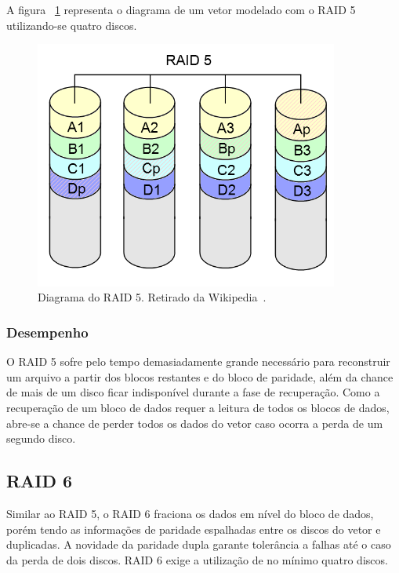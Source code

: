 		A figura ~\ref{fig:raid5} representa o diagrama de um vetor modelado com o RAID 5 utilizando-se quatro discos.\\
		
		\begin{figure}[htb]
			\begin{center}
				
				\includegraphics[clip,width=10.0cm]{images/RAID_5.png}
				\caption{Diagrama do RAID 5. Retirado da Wikipedia~\citep{wikiRAIDlevels}.}
				\label{fig:raid5}
			\end{center}
		\end{figure} 
		
		\subsubsection{Desempenho}
		O RAID 5 sofre pelo tempo demasiadamente grande necessário para reconstruir um arquivo a partir dos blocos restantes e do bloco de paridade, além da chance de mais de um disco ficar indisponível durante a fase de recuperação. Como a recuperação de um bloco de dados requer a leitura de todos os blocos de dados, abre-se a chance de perder todos os dados do vetor caso ocorra a perda de um segundo disco.\\
		
		\subsection{RAID 6}
		Similar ao RAID 5, o RAID 6 fraciona os dados em nível do bloco de dados, porém tendo as informações de paridade espalhadas entre os discos do vetor e duplicadas. A novidade da paridade dupla garante tolerância a falhas até o caso da perda de dois discos. RAID 6 exige a utilização de no mínimo quatro discos. \\ 
		
